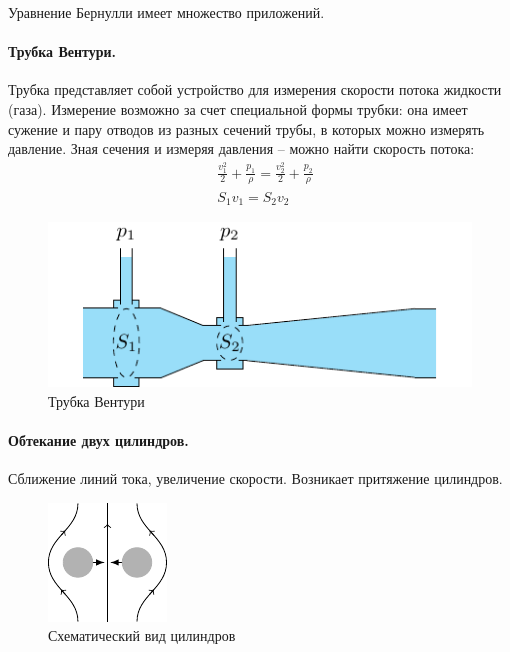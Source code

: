 Уравнение Бернулли имеет множество приложений.
\paragraph{Трубка Вентури.}
 Трубка представляет собой устройство для измерения скорости потока жидкости (газа). Измерение возможно за счет специальной формы трубки: она имеет сужение и пару отводов из разных сечений трубы, в которых можно измерять давление. Зная сечения и измеряя давления -- можно найти скорость потока:
\begin{align*}
& \frac { v _ { 1 } ^ { 2 } } { 2 } + \frac { p _ { 1 } } { \rho } = \frac { v _ { 2 } ^ { 2 } } { 2 } + \frac { p _ { 2 } } { \rho } \\
& S _ { 1 } v _ { 1 } = S _ { 2 } v _ { 2 }
\end{align*}
\begin{figure}[H]
	\centering
	\includegraphics[scale=1.3]{img/venturi}
	\caption{Трубка Вентури}
	\label{fig:figure8}
\end{figure}


\paragraph{Обтекание двух цилиндров.}
Сближение линий тока, увеличение скорости. Возникает притяжение цилиндров.
\begin{figure}[H]
	\centering
	\includegraphics[scale=1.5]{img/2cy}
	\caption{Схематический вид цилиндров}
	\label{fig:figure9}
\end{figure}

